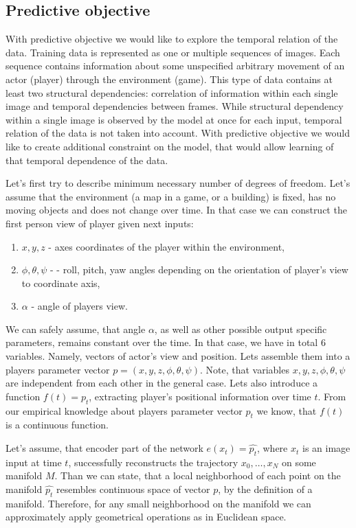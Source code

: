 \subsection{Predictive objective}

With predictive objective we would like to explore the temporal relation of the data.
Training data is represented as one or multiple sequences of images.
Each sequence contains information about some unspecified arbitrary movement of an actor (player) through the environment (game).
This type of data contains at least two structural dependencies: correlation of information within each single image and temporal dependencies between frames.
While structural dependency within a single image is observed by the model at once for each input, temporal relation of the data is not taken into account.
With predictive objective we would like to create additional constraint on the model, that would allow learning of that temporal dependence of the data.

Let's first try to describe minimum necessary number of degrees of freedom.
Let's assume that the environment (a map in a game, or a building) is fixed, has no moving objects and does not change over time.
In that case we can construct the first person view of player given next inputs:
\begin{enumerate}
  \item $x, y, z$ - axes coordinates of the player within the environment,
  \item $\phi, \theta, \psi$ -  - roll, pitch, yaw angles depending on the orientation of player's view to coordinate axis,
  \item $\alpha$ - angle of players view.
\end{enumerate}

We can safely assume, that angle $\alpha$, as well as other possible output specific parameters, remains constant over the time.
In that case, we have in total 6 variables.
Namely, vectors of actor's view and position.
Lets assemble them into a players parameter vector $p=(x, y, z, \phi, \theta, \psi)$.
Note, that variables $x, y, z, \phi, \theta, \psi$ are independent from each other in the general case.
Lets also introduce a function $f(t)=p_t$, extracting player's positional information over time $t$.
From our empirical knowledge about players parameter vector $p_t$ we know, that $f(t)$ is a continuous function.

Let's assume, that encoder part of the network $e(x_t)= \hat{p_t}$, where $x_t$ is an image input at time $t$, successfully reconstructs the trajectory ${x_0, \ldots, x_N}$ on some manifold $M$.
Than we can state, that a local neighborhood of each point on the manifold $\hat{p_t}$ resembles continuous space of vector $p$, by the definition of a manifold.
Therefore, for any small neighborhood on the manifold we can approximately apply geometrical operations as in Euclidean space.

